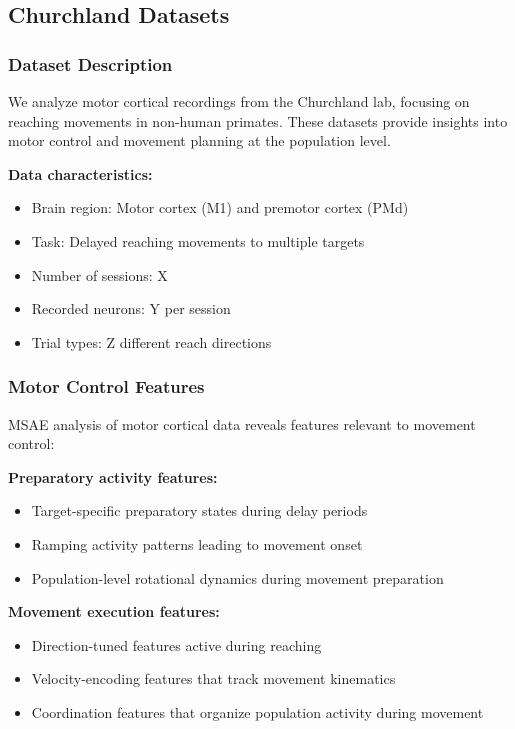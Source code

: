\subsection{Churchland Datasets}

\subsubsection{Dataset Description}

We analyze motor cortical recordings from the Churchland lab, focusing on reaching movements in non-human primates. These datasets provide insights into motor control and movement planning at the population level.

\textbf{Data characteristics:}
\begin{itemize}
\item Brain region: Motor cortex (M1) and premotor cortex (PMd)
\item Task: Delayed reaching movements to multiple targets
\item Number of sessions: X
\item Recorded neurons: Y per session
\item Trial types: Z different reach directions
\end{itemize}

\subsubsection{Motor Control Features}

MSAE analysis of motor cortical data reveals features relevant to movement control:

\textbf{Preparatory activity features:}
\begin{itemize}
\item Target-specific preparatory states during delay periods
\item Ramping activity patterns leading to movement onset
\item Population-level rotational dynamics during movement preparation
\end{itemize}

\textbf{Movement execution features:}
\begin{itemize}
\item Direction-tuned features active during reaching
\item Velocity-encoding features that track movement kinematics
\item Coordination features that organize population activity during movement
\end{itemize}

